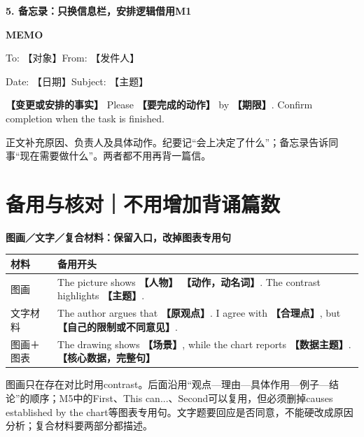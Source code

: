 \documentclass[11pt,a4paper,fontset=macnew]{ctexart}
\newenvironment{example}{\begingroup\fontsize{10.5}{14}\selectfont\setlength{\parskip}{4pt}}{\par\endgroup}
\begin{document}
\par\vspace{5pt}\noindent\textbf{5. 备忘录：只换信息栏，安排逻辑借用M1}\par\nopagebreak
\begin{example}\textbf{MEMO}\par To: 【对象】\quad From: 【发件人】\par Date: 【日期】\quad Subject: 【主题】\par\textbf{【变更或安排的事实】} Please \textbf{【要完成的动作】} by \textbf{【期限】}. Confirm completion when the task is finished.

\end{example}
正文补充原因、负责人及具体动作。纪要记“会上决定了什么”；备忘录告诉同事“现在需要做什么”。两者都不用再背一篇信。

\clearpage\section*{备用与核对｜不用增加背诵篇数}
\par\vspace{5pt}\noindent\textbf{图画／文字／复合材料：保留入口，改掉图表专用句}\par\nopagebreak
{\small
\begin{longtable}{L{26mm}L{131mm}}\toprule
\textbf{材料} & \textbf{备用开头}\\\midrule\endhead
图画 & The picture shows \textbf{【人物】} \textbf{【动作，动名词】}. The contrast highlights \textbf{【主题】}.\\
文字材料 & The author argues that \textbf{【原观点】}. I agree with \textbf{【合理点】}, but \textbf{【自己的限制或不同意见】}.\\
图画＋图表 & The drawing shows \textbf{【场景】}, while the chart reports \textbf{【数据主题】}. \textbf{【核心数据，完整句】}\\
\bottomrule\end{longtable}
}
图画只在存在对比时用contrast。后面沿用“观点—理由—具体作用—例子—结论”的顺序；M5中的First、This can...、Second可以复用，但必须删掉causes established by the chart等图表专用句。文字题要回应是否同意，不能硬改成原因分析；复合材料要两部分都描述。
\end{document}
